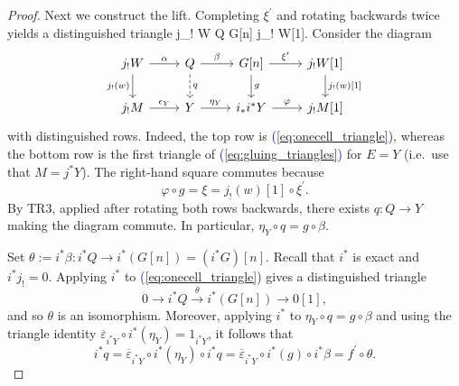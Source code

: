 \documentclass[11pt]{amsart}
\def\eqref#1{\textcolor{darkblue}{(\ref{#1})}}
\let\oldequation\equation
\let\oldendequation\endequation
\renewenvironment{equation}{\linenomathNonumbers\oldequation}{\oldendequation\endlinenomath}
\theoremstyle{plain}
\theoremstyle{definition}
\numberwithin{equation}{section}
\numberwithin{theorem}{section}
\begin{document}
\begin{proof}
    Next we construct the lift.
    Completing $\xi^\prime$ and rotating backwards twice yields a distinguished triangle
    \begin{equation}
        \label{eq:onecell_triangle}
        j_! W\xrightarrow{\alpha} Q\xrightarrow{\beta} G[n]\xrightarrow{\xi^\prime} j_! W[1].
    \end{equation}
    Consider the diagram
    \begin{displaymath}
        \begin{tikzcd}
            j_! W \ar[r, "\alpha"] \ar[d, "j_!(w)"'] & Q \ar[r, "\beta"] \ar[d, dashed, "q"] & G[n] \ar[r, "\xi^\prime"] \ar[d, "g"] & j_! W[1] \ar[d, "{j_!(w)[1]}"] \\
            j_! M \ar[r, "\epsilon_Y"] & Y \ar[r, "\eta_Y"] & i_\ast i^\ast Y \ar[r, "\varphi"] & j_! M [1]
        \end{tikzcd}
    \end{displaymath}
    with distinguished rows.
    Indeed, the top row is \eqref{eq:onecell_triangle}, whereas the bottom row is the first triangle of \eqref{eq:gluing_triangles} for $E = Y$ (i.e.\ use that $M = j^\ast Y$).
    The right-hand square commutes because 
    \begin{displaymath}
        \varphi\circ g = \xi = j_!(w)[1]\circ \xi^\prime.
    \end{displaymath}
    By TR3, applied after rotating both rows backwards, there exists $q\colon Q\to Y$ making the diagram commute.
    In particular, $\eta_Y\circ q = g\circ \beta$.

    Set $\theta := i^\ast\beta\colon i^\ast Q\to i^\ast(G[n]) = (i^\ast G)[n]$.
    Recall that $i^\ast$ is exact and $i^\ast j_! = 0$.
    Applying $i^\ast$ to \eqref{eq:onecell_triangle} gives a distinguished triangle
    \begin{displaymath}
        0\to i^\ast Q\xrightarrow{\theta} i^\ast(G[n])\to 0[1],
    \end{displaymath}
    and so $\theta$ is an isomorphism.
    Moreover, applying $i^\ast$ to $\eta_Y\circ q = g\circ \beta$ and using the triangle identity $\overline{\varepsilon}_{i^\ast Y}\circ i^\ast(\eta_Y) = 1_{i^\ast Y}$, it follows that
    \begin{displaymath}
        i^\ast q
        = \overline{\varepsilon}_{i^\ast Y}\circ i^\ast(\eta_Y)\circ i^\ast q
        = \overline{\varepsilon}_{i^\ast Y}\circ i^\ast(g)\circ i^\ast\beta
        = f^\prime\circ \theta.
    \end{displaymath}


\end{proof}
\end{document}
